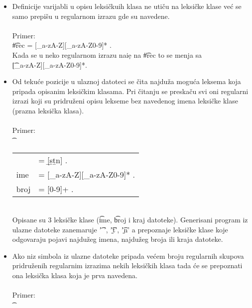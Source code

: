      \begin{itemize}
        \item
        {
          Definicije varijabli u opisu leksi\v ckuih klasa ne uti\v cu na
          leksi\v cke klase ve\'c se samo prepi\v su u regularnom izrazu
          gde su navedene.\\
          \\
          Primer:\\
          \t{\#rec = [\_a-zA-Z][\_a-zA-Z0-9]* .}\\
          Kada se u neko regularnom izrazu nai\d e na \t{\#rec} to se menja sa\\
          \t{[\_a-zA-Z][\_a-zA-Z0-9]*}.
        }
        \item
        {
          Od teku\'ce pozicije u ulaznoj datoteci se \v cita najdu\v za
          mogu\'ca leksema koja pripada opisanim leksi\v ckim klasama.
          Pri \v citanju se preska\v cu svi oni regularni izrazi koji su
          pridru\v zeni opisu lekseme bez navedenog imena leksi\v cke
          klase (prazna leksi\v cka klasa).\\
          \\
          Primer:\\
          \t
          {
            \begin{tabular}{ll}
                  &= [{\b}s{\b}t{\b}n] .\\
              ime &= [\_a-zA-Z][\_a-zA-Z0-9]* . \\
              broj&= [0-9]+ .\\
            \end{tabular}
          }\\
          Opisane su 3 leksi\v cke klase (\t{ime}, \t{broj} i kraj datoteke).
          Generisani program iz ulazne datoteke zanemaruje \t{' '},
          \t{'{\b}t'}, \t{'{\b}n'} a prepoznaje leksi\v cke klase koje
          odgovaraju pojavi najdu\v zeg imena, najdu\v zeg broja ili
          kraja datoteke.
        }
        \item
        {
          Ako niz simbola iz ulazne datoteke pripada ve\'cem broju regularnih
          skupova pridru\v zenih regularnim izrazima nekih leksi\v ckih
          klasa tada \'ce se prepoznati ona leksi\-\v cka klasa koja je prva
          navedena.\\
          \\
          Primer:\\
          \t
          {
            \begin{tabular}{ll}

\end{tabular}}}
\end{itemize}
